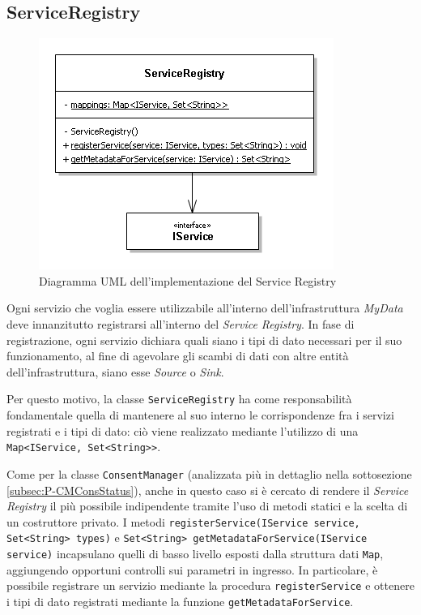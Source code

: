 \subsection{ServiceRegistry}
\label{subsec:P-serviceregistry}
\begin{figure} [h]
	\centering
	\includegraphics[width=0.5\linewidth]{pictures/ServiceRegistry.png}
	\caption{Diagramma UML dell'implementazione del Service Registry}
	\label{fig:ServiceRegistry}
\end{figure}
Ogni servizio che voglia essere utilizzabile all’interno dell’infrastruttura \textit{MyData} deve innanzitutto registrarsi all’interno del \textit{Service Registry}. In fase di registrazione, ogni servizio dichiara quali siano i tipi di dato necessari per il suo funzionamento, al fine di agevolare gli scambi di dati con altre entit\`a dell’infrastruttura, siano esse \textit{Source} o \textit{Sink}.

Per questo motivo, la classe \texttt{ServiceRegistry} ha come responsabilit\`a fondamentale quella di mantenere al suo interno le corrispondenze fra i servizi registrati e i tipi di dato: ci\`o viene realizzato mediante l’utilizzo di una \texttt{Map<IService, Set<String>{}>}.

Come per la classe \texttt{ConsentManager} (analizzata pi\`u in dettaglio nella sottosezione \ref{subsec:P-CMConsStatus}), anche in questo caso si \`e cercato di rendere il \textit{Service Registry} il pi\`u possibile indipendente tramite l’uso di metodi statici e la scelta di un costruttore privato. I metodi \texttt{registerService(IService service, Set<String> types)} e \texttt{Set<String> getMetadataForService(IService service)} incapsulano quelli di basso livello esposti dalla struttura dati \texttt{Map}, aggiungendo opportuni controlli sui parametri in ingresso. In particolare, \`e possibile registrare un servizio mediante la procedura \texttt{registerService} e ottenere i tipi di dato registrati mediante la funzione \texttt{getMetadataForService}.

